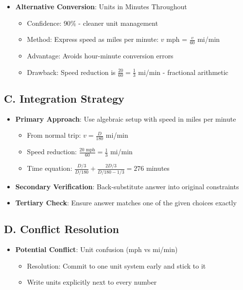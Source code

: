 \documentclass[11pt]{article}
\begin{document}
\begin{conversionbox}
\begin{itemize}[leftmargin=*]
    \item \textbf{Alternative Conversion}: Units in Minutes Throughout
    \begin{itemize}[leftmargin=*]
        \item Confidence: 90\% - cleaner unit management
        \item Method: Express speed as miles per minute: $v$ mph = $\frac{v}{60}$ mi/min
        \item Advantage: Avoids hour-minute conversion errors
        \item Drawback: Speed reduction is $\frac{20}{60} = \frac{1}{3}$ mi/min - fractional arithmetic
    \end{itemize}
\end{itemize}

\subsection*{C. Integration Strategy}
\begin{itemize}[leftmargin=*]
    \item \textbf{Primary Approach}: Use algebraic setup with speed in miles per minute
    \begin{itemize}[leftmargin=*]
        \item From normal trip: $v = \frac{D}{180}$ mi/min
        \item Speed reduction: $\frac{20 \text{ mph}}{60} = \frac{1}{3}$ mi/min
        \item Time equation: $\frac{D/3}{D/180} + \frac{2D/3}{D/180 - 1/3} = 276$ minutes
    \end{itemize}
    
    \item \textbf{Secondary Verification}: Back-substitute answer into original constraints
    
    \item \textbf{Tertiary Check}: Ensure answer matches one of the given choices exactly
\end{itemize}

\subsection*{D. Conflict Resolution}
\begin{itemize}[leftmargin=*]
    \item \textbf{Potential Conflict}: Unit confusion (mph vs mi/min)
    \begin{itemize}[leftmargin=*]
        \item Resolution: Commit to one unit system early and stick to it
        \item Write units explicitly next to every number
    \end{itemize}
    

\end{itemize}
\end{conversionbox}
\end{document}
